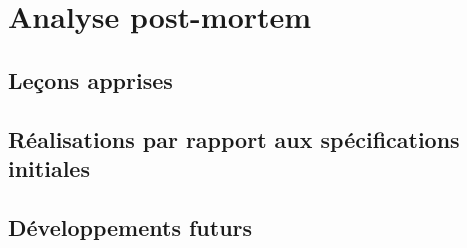 \section{Analyse post-mortem}
\lipsumC

    \subsection{Leçons apprises}
    \lipsumC
    
    \subsection{Réalisations par rapport aux spécifications initiales}
    \lipsumC
    
    \subsection{Développements futurs}
    \lipsumC
